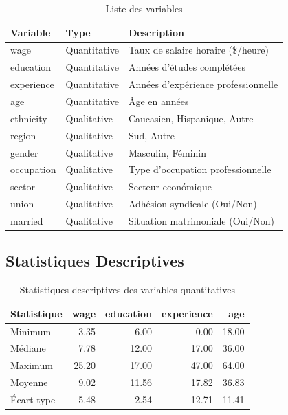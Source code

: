 \documentclass[12pt,a4paper]{report}
\begin{document}
\begin{table}[H]
\centering
\caption{Liste des variables}
\begin{tabular}{|l|p{3cm}|p{4cm}|}
\hline
\textbf{Variable} & \textbf{Type} & \textbf{Description} \\
\hline
wage & Quantitative & Taux de salaire horaire (\$/heure) \\
\hline
education & Quantitative & Années d'études complétées \\
\hline
experience & Quantitative & Années d'expérience professionnelle \\
\hline
age & Quantitative & Âge en années \\
\hline
ethnicity & Qualitative & Caucasien, Hispanique, Autre \\
\hline
region & Qualitative & Sud, Autre \\
\hline
gender & Qualitative & Masculin, Féminin \\
\hline
occupation & Qualitative & Type d'occupation professionnelle \\
\hline
sector & Qualitative & Secteur económique \\
\hline
union & Qualitative & Adhésion syndicale (Oui/Non) \\
\hline
married & Qualitative & Situation matrimoniale (Oui/Non) \\
\hline
\end{tabular}
\end{table}

\subsection{Statistiques Descriptives}

\begin{table}[H]
\centering
\caption{Statistiques descriptives des variables quantitatives}
\begin{tabular}{|l|r|r|r|r|}
\hline
\textbf{Statistique} & \textbf{wage} & \textbf{education} & \textbf{experience} & \textbf{age} \\
\hline
Minimum & 3.35 & 6.00 & 0.00 & 18.00 \\
\hline
Médiane & 7.78 & 12.00 & 17.00 & 36.00 \\
\hline
Maximum & 25.20 & 17.00 & 47.00 & 64.00 \\
\hline
Moyenne & 9.02 & 11.56 & 17.82 & 36.83 \\
\hline
Écart-type & 5.48 & 2.54 & 12.71 & 11.41 \\
\hline
\end{tabular}
\end{table}
\end{document}
